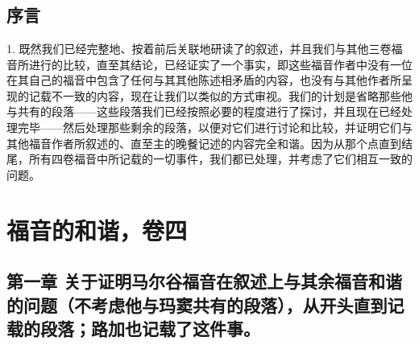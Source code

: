 
\section{}

\par


\subsection{序言}

1. 既然我们已经完整地、按着前后关联地研读了的叙述，并且我们与其他三卷福音所进行的比较，直至其结论，已经证实了一个事实，即这些福音作者中没有一位在其自己的福音中包含了任何与其其他陈述相矛盾的内容，也没有与其他作者所呈现的记载不一致的内容，现在让我们以类似的方式审视。我们的计划是省略那些他与共有的段落——这些段落我们已经按照必要的程度进行了探讨，并且现在已经处理完毕——然后处理那些剩余的段落，以便对它们进行讨论和比较，并证明它们与其他福音作者所叙述的、直至主的晚餐记述的内容完全和谐。因为从那个点直到结尾，所有四卷福音中所记载的一切事件，我们都已处理，并考虑了它们相互一致的问题。\par



\section{福音的和谐，卷四}


\subsection{第一章 关于证明马尔谷福音在叙述上与其余福音和谐的问题（不考虑他与玛窦共有的段落），从开头直到记载的段落；路加也记载了这件事。}


